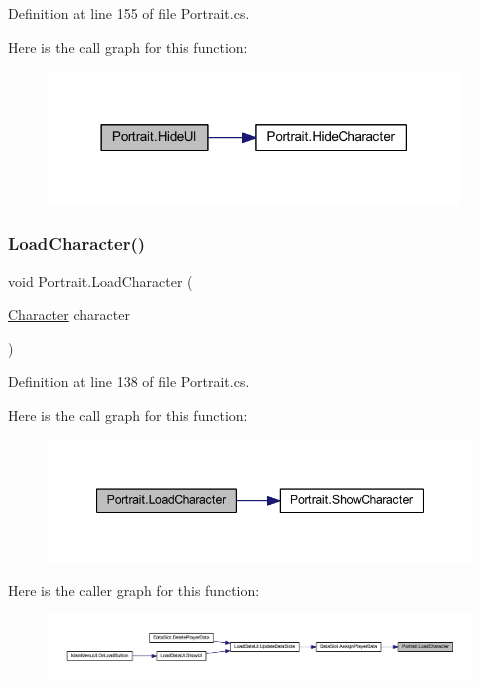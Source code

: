 Definition at line 155 of file Portrait.\+cs.

Here is the call graph for this function\+:
\nopagebreak
\begin{figure}[H]
\begin{center}
\leavevmode
\includegraphics[width=309pt]{class_portrait_ac5ab4bb350640a35c516bffa2fc45fe3_cgraph}
\end{center}
\end{figure}
\mbox{\label{class_portrait_a003483e7707bbb34e09ef3736e5b5b41}} 
\subsubsection{\texorpdfstring{LoadCharacter()}{LoadCharacter()}}
{\footnotesize\ttfamily void Portrait.\+Load\+Character (\begin{DoxyParamCaption}\item[{\mbox{\hyperlink{class_character}{Character}}}]{character }\end{DoxyParamCaption})}



Definition at line 138 of file Portrait.\+cs.

Here is the call graph for this function\+:
\nopagebreak
\begin{figure}[H]
\begin{center}
\leavevmode
\includegraphics[width=347pt]{class_portrait_a003483e7707bbb34e09ef3736e5b5b41_cgraph}
\end{center}
\end{figure}
Here is the caller graph for this function\+:
\nopagebreak
\begin{figure}[H]
\begin{center}
\leavevmode
\includegraphics[width=350pt]{class_portrait_a003483e7707bbb34e09ef3736e5b5b41_icgraph}
\end{center}
\end{figure}
\mbox{\label{class_portrait_a357f23630fd1689f2de8ef7a114c151e}} 
